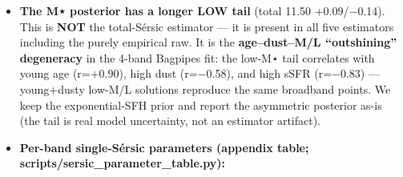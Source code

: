 \documentclass[
]{article}
\providecommand{\tightlist}{%
  \setlength{\itemsep}{0pt}\setlength{\parskip}{0pt}}
\newcommand{\BreakablePath}[1]{{\ttfamily\sloppy #1}}
\begin{document}
\begin{itemize}
  \begin{itemize}
  \tightlist
  \item
    a PA grid + circular fallback, lowest-residual). It recovers the
    true shape; \textbf{M⋆ headline (total) is unchanged at 11.47}
    (empirical-aperture-dominated). Validated by injection-recovery
    against astropy's peer-reviewed \BreakablePath{Sersic2D}
    (\BreakablePath{scripts/\discretionary{}{}{}validate\_\discretionary{}{}{}sersic\_\discretionary{}{}{}fitter\_\discretionary{}{}{}synthetic.\discretionary{}{}{}py}):
    clean recovery for the deflector regime (n≈1.2--1.6, b/a≤0.85), with
    a realistic \textbf{b/a uncertainty \textasciitilde±0.06} (the
    formal bootstrap is too tight). GALFIT/imfit/petrofit/statmorph are
    not installed (conda-env policy).
  \end{itemize}
\item
  \textbf{The M⋆ posterior has a longer LOW tail} (total 11.50
  +0.09/−0.14). This is \textbf{NOT} the total-Sérsic estimator --- it
  is present in all five estimators including the purely empirical
  \BreakablePath{raw}. It is the \textbf{age--dust--M/L ``outshining''
  degeneracy} in the 4-band Bagpipes fit: the low-M⋆ tail correlates
  with young age (r=+0.90), high dust (r=−0.58), and high sSFR (r=−0.83)
  --- young+dusty low-M/L solutions reproduce the same broadband points.
  We keep the exponential-SFH prior and report the asymmetric posterior
  as-is (the tail is real model uncertainty, not an estimator artifact).
\item
  \textbf{Per-band single-Sérsic parameters (appendix table;
  \BreakablePath{scripts/\discretionary{}{}{}sersic\_\discretionary{}{}{}parameter\_\discretionary{}{}{}table.\discretionary{}{}{}py}):}
\end{itemize}
\end{document}
